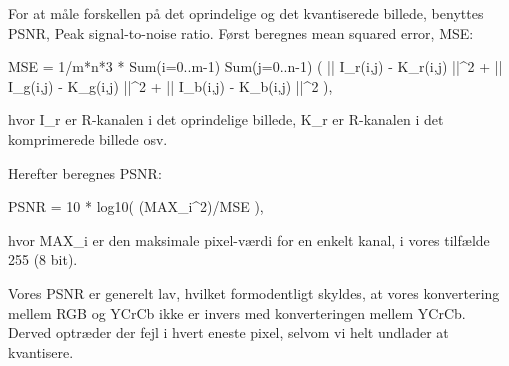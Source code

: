 For at måle forskellen på det oprindelige og det kvantiserede billede, benyttes PSNR, Peak signal-to-noise ratio. Først beregnes mean squared error, MSE:

MSE = 1/m*n*3 * Sum(i=0..m-1) Sum(j=0..n-1) ( || I_r(i,j) - K_r(i,j) ||^2 + || I_g(i,j) - K_g(i,j) ||^2 + || I_b(i,j) - K_b(i,j) ||^2 ),

hvor I_r er R-kanalen i det oprindelige billede, K_r er R-kanalen i det komprimerede billede osv.

Herefter beregnes PSNR:

PSNR = 10 * log10( (MAX_i^2)/MSE ),

hvor MAX_i er den maksimale pixel-værdi for en enkelt kanal, i vores tilfælde 255 (8 bit).

Vores PSNR er generelt lav, hvilket formodentligt skyldes, at vores konvertering mellem RGB og YCrCb ikke er invers med konverteringen mellem YCrCb. Derved optræder der fejl i hvert eneste pixel, selvom vi helt undlader at kvantisere.


